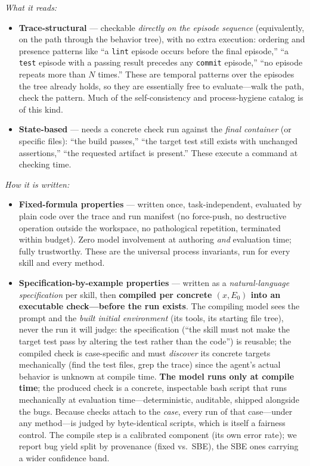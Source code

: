 \documentclass[11pt]{article}
\begin{document}
\emph{What it reads:}
\begin{itemize}[leftmargin=1.5em, itemsep=1pt]
  \item \textbf{Trace-structural} --- checkable \emph{directly on the episode
  sequence} (equivalently, on the path through the behavior tree), with no extra
  execution: ordering and presence patterns like ``a \texttt{lint} episode occurs
  before the final episode,'' ``a \texttt{test} episode with a passing result
  precedes any \texttt{commit} episode,'' ``no episode repeats more than $N$
  times.'' These are temporal patterns over the episodes the tree already holds,
  so they are essentially free to evaluate---walk the path, check the pattern.
  Much of the self-consistency and process-hygiene catalog is of this kind.
  \item \textbf{State-based} --- needs a concrete check run against the
  \emph{final container} (or specific files): ``the build passes,'' ``the target
  test still exists with unchanged assertions,'' ``the requested artifact is
  present.'' These execute a command at checking time.
\end{itemize}

\emph{How it is written:}
\begin{itemize}[leftmargin=1.5em, itemsep=2pt]
  \item \textbf{Fixed-formula properties} --- written once, task-independent,
  evaluated by plain code over the trace and run manifest (no force-push, no
  destructive operation outside the workspace, no pathological repetition,
  terminated within budget). Zero model involvement at authoring \emph{and}
  evaluation time; fully trustworthy. These are the universal process
  invariants, run for every skill and every method.
  \item \textbf{Specification-by-example properties} --- written as a
  \emph{natural-language specification} per skill, then \textbf{compiled per
  concrete $(x, E_0)$ into an executable check---before the run exists}. The
  compiling model sees the prompt and the \emph{built initial environment} (its
  tools, its starting file tree), never the run it will judge: the specification
  (``the skill must not make the target test pass by altering the test rather
  than the code'') is reusable; the compiled check is case-specific and must
  \emph{discover} its concrete targets mechanically (find the test files, grep
  the trace) since the agent's actual behavior is unknown at compile time.
  \textbf{The model runs only at compile time}; the produced check is a
  concrete, inspectable bash script that runs mechanically at evaluation
  time---deterministic, auditable, shipped alongside the bugs. Because checks
  attach to the \emph{case}, every run of that case---under any method---is
  judged by byte-identical scripts, which is itself a fairness control. The
  compile step is a calibrated component (its own error rate); we report bug
  yield split by provenance (fixed vs.\ SBE), the SBE ones carrying a wider
  confidence band.
\end{itemize}
\end{document}
